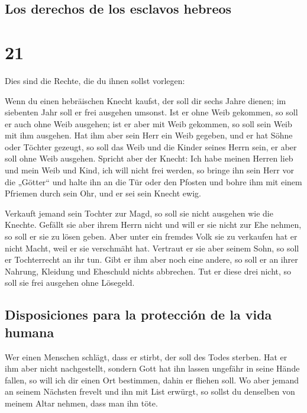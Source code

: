 \hypertarget{los-derechos-de-los-esclavos-hebreos}{%
\subsection{Los derechos de los esclavos
hebreos}\label{los-derechos-de-los-esclavos-hebreos}}

\hypertarget{section-20}{%
\section{21}\label{section-20}}

 Dies sind die Rechte, die du ihnen sollst vorlegen:

 Wenn du einen hebräischen Knecht kaufst, der soll dir
sechs Jahre dienen; im siebenten Jahr soll er frei ausgehen umsonst.
 Ist er ohne Weib gekommen, so soll er auch ohne Weib
ausgehen; ist er aber mit Weib gekommen, so soll sein Weib mit ihm
ausgehen.  Hat ihm aber sein Herr ein Weib gegeben, und er
hat Söhne oder Töchter gezeugt, so soll das Weib und die Kinder seines
Herrn sein, er aber soll ohne Weib ausgehen.  Spricht aber
der Knecht: Ich habe meinen Herren lieb und mein Weib und Kind, ich will
nicht frei werden,  so bringe ihn sein Herr vor die
„Götter`` und halte ihn an die Tür oder den Pfosten und bohre ihm mit
einem Pfriemen durch sein Ohr, und er sei sein Knecht ewig.

 Verkauft jemand sein Tochter zur Magd, so soll sie nicht
ausgehen wie die Knechte.  Gefällt sie aber ihrem Herrn
nicht und will er sie nicht zur Ehe nehmen, so soll er sie zu lösen
geben. Aber unter ein fremdes Volk sie zu verkaufen hat er nicht Macht,
weil er sie verschmäht hat.  Vertraut er sie aber seinem
Sohn, so soll er Tochterrecht an ihr tun.  Gibt er ihm
aber noch eine andere, so soll er an ihrer Nahrung, Kleidung und
Eheschuld nichts abbrechen.  Tut er diese drei nicht, so
soll sie frei ausgehen ohne Lösegeld.

\hypertarget{disposiciones-para-la-protecciuxf3n-de-la-vida-humana}{%
\subsection{Disposiciones para la protección de la vida
humana}\label{disposiciones-para-la-protecciuxf3n-de-la-vida-humana}}

 Wer einen Menschen schlägt, dass er stirbt, der soll des
Todes sterben.  Hat er ihm aber nicht nachgestellt,
sondern Gott hat ihn lassen ungefähr in seine Hände fallen, so will ich
dir einen Ort bestimmen, dahin er fliehen soll.  Wo aber
jemand an seinem Nächsten frevelt und ihn mit List erwürgt, so sollst du
denselben von meinem Altar nehmen, dass man ihn töte.

